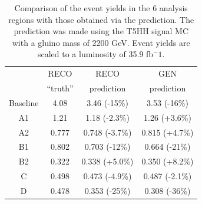 \begin{table}
\centering
\caption[Predicted yields in the 6 signal bins using reinterpretation prescription.]{
Comparison of the event yields in the 6 analysis regions with those obtained via the prediction. The prediction was made using the T5HH signal MC with a gluino mass of 2200 GeV. Event yields are scaled to a luminosity of 35.9 fb$^-{1}$.
}
\begin{tabular}{c | c c c}
\hline\hline
         & RECO & RECO           & GEN\\
         & ``truth''             & prediction     & prediction\\
\hline
Baseline & 4.08     & 3.46 (-15\%)   & 3.53 (-16\%)\\
A1       & 1.21     & 1.18 (-2.3\%)  & 1.26 (+3.6\%)\\
A2       & 0.777    & 0.748 (-3.7\%) & 0.815 (+4.7\%)\\
B1       & 0.802    & 0.703 (-12\%)  & 0.664 (-21\%)\\
B2       & 0.322    & 0.338 (+5.0\%) & 0.350 (+8.2\%)\\
C        & 0.498    & 0.473 (-4.9\%) & 0.487 (-2.1\%)\\
D        & 0.478    & 0.353 (-25\%)   & 0.308 (-36\%)\\
\hline\hline
\end{tabular}
\label{tab:predclos}
\end{table}

%
